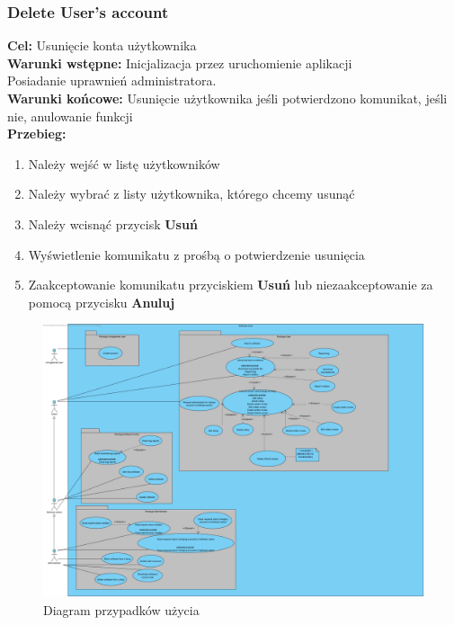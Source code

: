 \documentclass[12pt,a4paper]{article}
\begin{document}
\subsubsection{Delete User's account}
\textbf{Cel: } Usunięcie konta użytkownika \\
\textbf{Warunki wstępne:} Inicjalizacja przez uruchomienie aplikacji\\ Posiadanie uprawnień administratora.\\
\textbf{Warunki końcowe:} Usunięcie użytkownika jeśli potwierdzono komunikat, jeśli nie, anulowanie funkcji\\
\textbf{Przebieg:}
\begin{enumerate}
    \item Należy wejść w listę użytkowników
    \item Należy wybrać z listy użytkownika, którego chcemy usunąć
    \item Należy wcisnąć przycisk \textbf{Usuń}
    \item Wyświetlenie komunikatu z prośbą o potwierdzenie usunięcia
    \item Zaakceptowanie komunikatu przyciskiem \textbf{Usuń} lub niezaakceptowanie za pomocą przycisku \textbf{Anuluj}
\end{enumerate}


\begin{figure}[H]
    \centering
    \centerline{
    \includegraphics[width=1.35\textwidth]{Diagram przypadków użycia.png}
    }
    \caption{Diagram przypadków użycia}
    \label{fig:diagram_przypadkow}
\end{figure}
\end{document}
